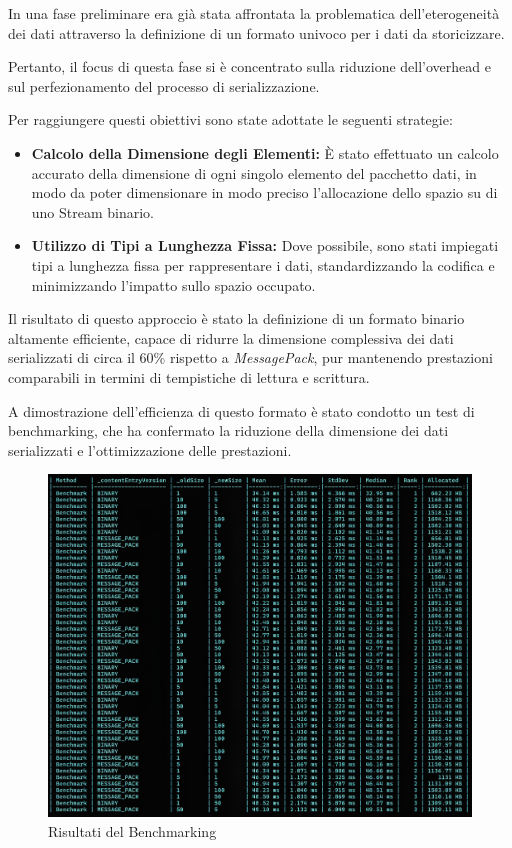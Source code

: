 \documentclass[12pt,a4paper,openright,twoside]{book}
\begin{document}
            In una fase preliminare era già stata affrontata la problematica dell’eterogeneità dei dati attraverso la definizione di un formato univoco per i dati da storicizzare.

            Pertanto, il focus di questa fase si è concentrato sulla riduzione dell’overhead e sul perfezionamento del processo di serializzazione.

            Per raggiungere questi obiettivi sono state adottate le seguenti strategie:
            \begin{itemize}
                \item \textbf{Calcolo della Dimensione degli Elementi:} È stato effettuato un calcolo accurato della dimensione di ogni singolo elemento del pacchetto dati, in modo da poter dimensionare in modo preciso l’allocazione dello spazio su di uno Stream binario.
                \item \textbf{Utilizzo di Tipi a Lunghezza Fissa:} Dove possibile, sono stati impiegati tipi a lunghezza fissa per rappresentare i dati, standardizzando la codifica e minimizzando l’impatto sullo spazio occupato.
            \end{itemize}

            Il risultato di questo approccio è stato la definizione di un formato binario altamente efficiente, capace di ridurre la dimensione complessiva dei dati serializzati di circa il 60\% rispetto a \textit{MessagePack}, pur mantenendo prestazioni comparabili in termini di tempistiche di lettura e scrittura.

            A dimostrazione dell'efficienza di questo formato è stato condotto un test di benchmarking, che ha confermato la riduzione della dimensione dei dati serializzati e l'ottimizzazione delle prestazioni.

            \begin{figure} [h]
                \centering
                \includegraphics[width=1\linewidth]{figures/BenchmarkS-D.jpeg}
                \caption{Risultati del Benchmarking}
                \label{fig:serialization}
            \end{figure}
\end{document}
